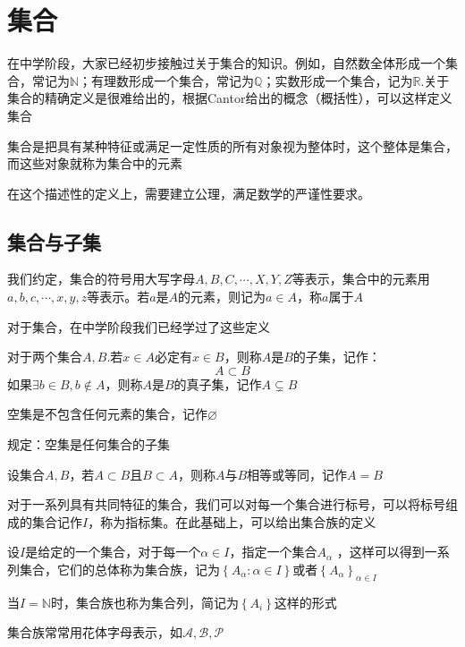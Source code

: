 \chapter{集合}

在中学阶段，大家已经初步接触过关于集合的知识。例如，自然数全体形成一个集合，常记为$\mathbb{N}$；有理数形成一个集合，常记为$\mathbb{Q}$；实数形成一个集合，记为$\mathbb{R}$.关于集合的精确定义是很难给出的，根据Cantor给出的概念（概括性），可以这样定义集合

\begin{definition}
    集合是把具有某种特征或满足一定性质的所有对象视为整体时，这个整体是集合，而这些对象就称为集合中的元素
\end{definition}

在这个描述性的定义上，需要建立公理，满足数学的严谨性要求。

\section{集合与子集}

我们约定，集合的符号用大写字母$A,B,C,\cdots,X,Y,Z$等表示，集合中的元素用$a,b,c,\cdots,x,y,z$等表示。若$a$是$A$的元素，则记为$a \in A$，称$a$属于$A$

对于集合，在中学阶段我们已经学过了这些定义

\begin{definition}
    对于两个集合$A,B$.若$x \in A$必定有$x \in B$，则称$A$是$B$的子集，记作：
    \[ A\subset B \]
    如果$\exists b \in B, b \notin A$，则称$A$是$B$的真子集，记作$A\subsetneq B$
\end{definition}

\begin{definition}
    空集是不包含任何元素的集合，记作$\varnothing $

    规定：空集是任何集合的子集
\end{definition}

\begin{definition}
    设集合$A,B$，若$A\subset B$且$B \subset A$，则称$A$与$B$相等或等同，记作$A=B$
\end{definition}

对于一系列具有共同特征的集合，我们可以对每一个集合进行标号，可以将标号组成的集合记作$I$，称为指标集。在此基础上，可以给出集合族的定义

\begin{definition}
    设$I$是给定的一个集合，对于每一个$\alpha \in I$，指定一个集合$A_\alpha$ ，这样可以得到一系列集合，它们的总体称为集合族，记为$\left\{A_\alpha : \alpha \in I \right\}$或者$\left\{A_\alpha \right\}_{\alpha \in I}$

    当$I=\mathbb{N}$时，集合族也称为集合列，简记为$\left\{A_i \right\}$这样的形式

    集合族常常用花体字母表示，如$\mathcal{A},\mathcal{B} ,\mathcal{P} $ 
\end{definition}

